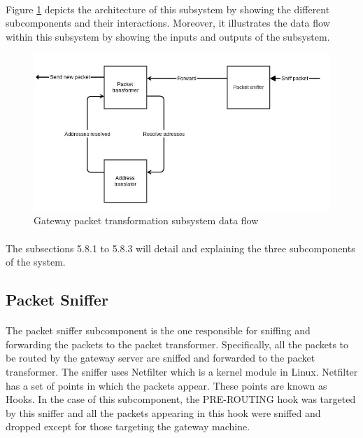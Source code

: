 \documentclass[12pt,a4paper,final]{report}
\begin{document}
\paragraph{}
Figure \ref{fig:gateway_transformation} depicts the architecture of this subsystem by showing the different subcomponents and their interactions. Moreover, it illustrates the data flow within this subsystem by showing the inputs and outputs of the subsystem.

\begin{figure}[htbp]
\centering
\includegraphics[scale=0.6]{img/packet_transformation.jpg}
\caption{Gateway packet transformation subsystem data flow}
\label{fig:gateway_transformation}
\end{figure}
\paragraph{}
The subsections 5.8.1 to 5.8.3 will detail and explaining the three subcomponents of the system.

\subsection{Packet Sniffer}
\paragraph{}
The packet sniffer subcomponent is the one responsible for sniffing and forwarding the packets to the packet transformer. Specifically, all the packets to be routed by the gateway server are sniffed and forwarded to the packet transformer. The sniffer uses Netfilter which is a kernel module in Linux. Netfilter has a set of points in which the packets appear. These points are known as Hooks. In the case of this subcomponent, the PRE-ROUTING hook was targeted by this sniffer and all the packets appearing in this hook were sniffed and dropped except for those targeting the gateway machine.  
\end{document}
